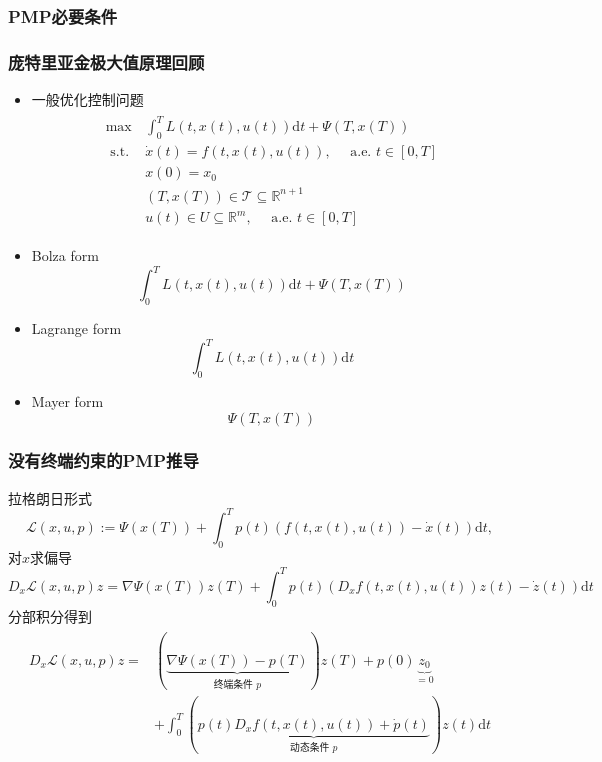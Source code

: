 \documentclass[UTF8, aspectratio=169, 9pt]{ctexbeamer}
\begin{document}
\subsubsection{PMP必要条件}
\begin{frame}
  \frametitle{庞特里亚金极大值原理回顾}
  \begin{itemize}
    \item 一般优化控制问题
    \begin{align}
      \begin{split}
\max  \, & \int_{0}^{T} L(t, x(t), u(t)) \mathrm{d} t+\Psi(T, x(T)) \\
 \text { s.t. } & \dot{x}(t)=f(t, x(t), u(t)), \quad \text { a.e. } t \in[0, T] \\
& x(0)=x_{0} \\
& (T, x(T)) \in \mathcal{T} \subseteq \mathbb{R}^{n+1} \\
& u(t) \in U \subseteq \mathbb{R}^{m}, \quad \text { a.e. } t \in[0, T]
\end{split}
    \end{align}
    \item Bolza form
    $$ \int_{0}^{T} L(t, x(t), u(t)) \mathrm{d} t+\Psi(T, x(T)) $$
    \item Lagrange form
    $$ \int_{0}^{T} L(t, x(t), u(t)) \mathrm{d} t
    $$
    \item Mayer form
    $$ \Psi(T, x(T))
    $$
  \end{itemize}
\end{frame}

\begin{frame}
\frametitle{没有终端约束的PMP推导 }
拉格朗日形式
$$
  \mathcal{L}(x, u, p):=\Psi(x(T))+\int_{0}^{T} p(t)(f(t, x(t), u(t))-\dot{x}(t)) \mathrm{d} t,
$$
对$x$求偏导
$$
D_{x} \mathcal{L}(x, u, p) z=\nabla \Psi(x(T)) z(T)+\int_{0}^{T} p(t)\left(D_{x} f(t, x(t), u(t)) z(t)-\dot{z}(t)\right) \mathrm{d} t
$$
分部积分得到
\begin{align*}
  \begin{split}
  D_{x} \mathcal{L}(x, u, p) z=&(\underbrace{\nabla \Psi(x(T))-p(T)}_{\text {终端条件 } p}) z(T)+p(0) \underbrace{z_{0}}_{=0} \\
&+\int_{0}^{T}(\underbrace{p(t) D_{x} f(t, x(t), u(t))+\dot{p}(t)}_{\text {动态条件 } p}) z(t) \mathrm{d} t
  \end{split}
\end{align*}
\end{frame}
\end{document}
